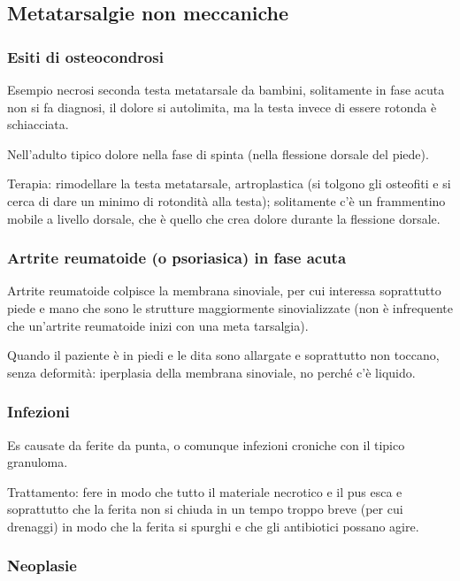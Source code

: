 \subsection{Metatarsalgie non meccaniche}

\subsubsection{Esiti di osteocondrosi}

Esempio necrosi seconda testa metatarsale da bambini, solitamente in fase acuta non si fa diagnosi, il dolore si autolimita, ma la testa invece di essere rotonda è schiacciata.

Nell'adulto tipico dolore nella fase di spinta (nella flessione dorsale del piede).

Terapia: rimodellare la testa metatarsale, artroplastica (si tolgono gli osteofiti e si cerca di dare un minimo di rotondità alla testa); solitamente c'è un frammentino mobile a livello dorsale, che è quello che crea dolore durante la flessione dorsale.

\subsubsection{Artrite reumatoide (o psoriasica) in fase acuta}

Artrite reumatoide colpisce la membrana sinoviale, per cui interessa soprattutto piede e mano che sono le strutture maggiormente sinovializzate (non è infrequente che un'artrite reumatoide inizi con una meta tarsalgia).

Quando il paziente è in piedi e le dita sono allargate e soprattutto non toccano, senza deformità: iperplasia della membrana sinoviale, no perché c'è liquido.

\subsubsection{Infezioni}

Es causate da ferite da punta, o comunque infezioni croniche con il tipico granuloma.

Trattamento: fere in modo che tutto il materiale necrotico e il pus esca e soprattutto che la ferita non si chiuda in un tempo troppo breve (per cui drenaggi) in modo che la ferita si spurghi e che gli antibiotici possano agire.

\subsubsection{Neoplasie}

